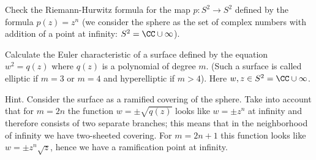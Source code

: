 \begin{xca}
Check the Riemann-Hurwitz formula for the map $p\colon S^2\to
S^2$ defined by the formula $p(z)=z^n$ (we consider the sphere as
the set of complex numbers with addition of a point at infinity:
$S^2 = \CC\cup\infty$). 
\end{xca}
\begin{xca}
Calculate the Euler characteristic of a surface defined by the
equation $w^2=q(z)$ where $q(z)$ is a polynomial of degree
$m$. (Such a surface is called elliptic if $m=3$ or $m=4$ and
hyperelliptic if $m>4$). Here $w, z \in S^2 = \CC\cup\infty$.

Hint. Consider the surface as a ramified covering of the
sphere. Take into account that for $m=2n$ the function
$w=\pm\sqrt{q(z)}$ looks like $w=\pm{}z^n$ at infinity and
therefore consists of two separate branches; this means that in
the neighborhood of infinity we have two-sheeted covering. For
$m=2n+1$ this function looks like $w=\pm z^{n}\sqrt{z}$, hence we
have a ramification point at infinity.
\end{xca}

